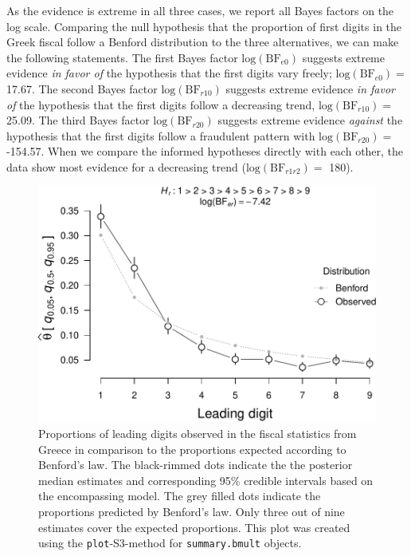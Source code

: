 \documentclass[
  english,
  man,floatsintext]{apa6}
\begin{document}
As the evidence is extreme in all three cases, we report all Bayes factors on the log scale. Comparing the null hypothesis that the proportion of first digits in the Greek fiscal follow a Benford distribution to the three alternatives, we can make the following statements. The first Bayes factor \(\text{log}(\text{BF}_{e0})\) suggests extreme evidence \textit{in favor of} the hypothesis that the first digits vary freely; \(\text{log}(\text{BF}_{e0}) =\) 17.67. The second Bayes factor \(\text{log}(\text{BF}_{r10})\) suggests extreme evidence \textit{in favor of} the hypothesis that the first digits follow a decreasing trend, \(\text{log}(\text{BF}_{r10}) =\) 25.09. The third Bayes factor \(\text{log}(\text{BF}_{r20})\) suggests extreme evidence \textit{against} the hypothesis that the first digits follow a fraudulent pattern with \(\text{log}(\text{BF}_{r20}) =\) -154.57. When we compare the informed hypotheses directly with each other, the data show most evidence for a decreasing trend (\(\text{log}(\text{BF}_{r1r2}) =\) 180).



\begin{figure}
\centering
\includegraphics{Rpackage_paper_files/figure-latex/benford-alt-1.pdf}
\caption{\label{fig:benford-alt}Proportions of leading digits observed in the fiscal statistics from Greece in comparison to the proportions expected according to Benford's law. The black-rimmed dots indicate the the posterior median estimates and corresponding 95\% credible intervals based on the encompassing model. The grey filled dots indicate the proportions predicted by Benford's law. Only three out of nine estimates cover the expected proportions. This plot was created using the \texttt{plot}-S3-method for \texttt{summary.bmult} objects.}
\end{figure}
\end{document}
